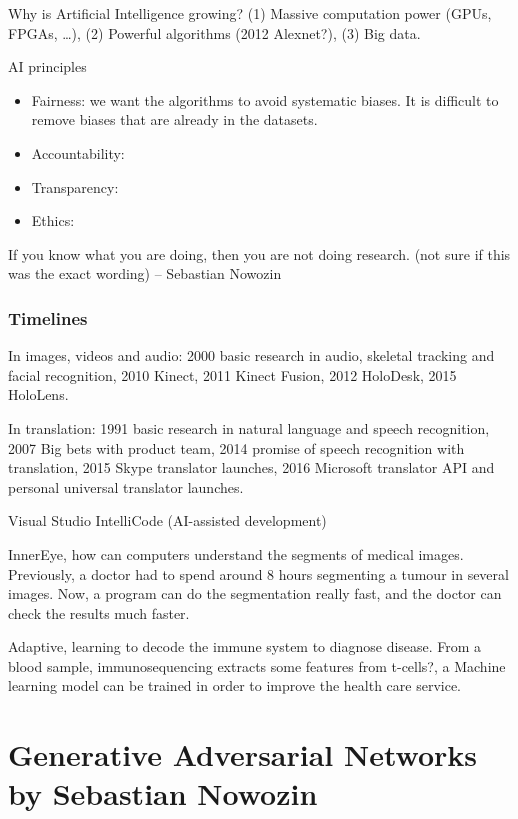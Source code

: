 \documentclass[b5paper]{report}
\begin{document}
Why is Artificial Intelligence growing? (1) Massive computation power (GPUs,
FPGAs, \dots), (2) Powerful algorithms (2012 Alexnet?), (3) Big data.

AI principles

\begin{itemize}
  \item Fairness: we want the algorithms to avoid systematic biases. It is
    difficult to remove biases that are already in the datasets.
  \item Accountability:
  \item Transparency:
  \item Ethics:
\end{itemize}

\begin{mybox}
  If you know what you are doing, then you are not doing research. (not sure if
  this was the exact wording) -- Sebastian Nowozin
\end{mybox}

\subsection{Timelines}

In images, videos and audio: 2000 basic research in audio, skeletal tracking
and facial recognition, 2010 Kinect, 2011 Kinect Fusion, 2012 HoloDesk, 2015
HoloLens.

In translation: 1991 basic research in natural language and speech recognition,
2007 Big bets with product team, 2014 promise of speech recognition with
translation, 2015 Skype translator launches, 2016 Microsoft translator API and
personal universal translator launches.

Visual Studio IntelliCode (AI-assisted development)

InnerEye, how can computers understand the segments of medical images.
Previously, a doctor had to spend around 8 hours segmenting a tumour in several
images. Now, a program can do the segmentation really fast, and the doctor can
check the results much faster.

Adaptive, learning to decode the immune system to diagnose disease. From a
blood sample, immunosequencing extracts some features from t-cells?, a Machine
learning model can be trained in order to improve the health care service.

\chapter{Generative Adversarial Networks by Sebastian Nowozin}
\end{document}
